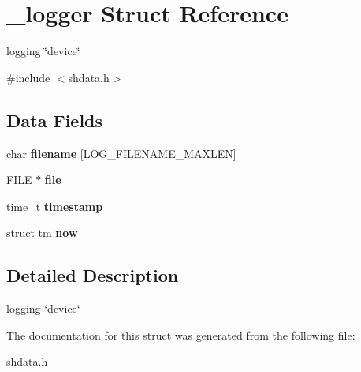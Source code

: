 \hypertarget{struct__logger}{\section{\-\_\-logger Struct Reference}
\label{struct__logger}
}


logging \char`\"{}device\char`\"{}  




{\ttfamily \#include $<$shdata.\-h$>$}

\subsection*{Data Fields}
\begin{DoxyCompactItemize}
\item 
\hypertarget{struct__logger_aa9c4b330499a3e9f78db33fba42e2f52}{char {\bfseries filename} \mbox{[}L\-O\-G\-\_\-\-F\-I\-L\-E\-N\-A\-M\-E\-\_\-\-M\-A\-X\-L\-E\-N\mbox{]}}\label{struct__logger_aa9c4b330499a3e9f78db33fba42e2f52}

\item 
\hypertarget{struct__logger_a702945180aa732857b380a007a7e2a21}{F\-I\-L\-E $\ast$ {\bfseries file}}\label{struct__logger_a702945180aa732857b380a007a7e2a21}

\item 
\hypertarget{struct__logger_a2f48d949c7a1e7bf2ce81c70caa7c3ec}{time\-\_\-t {\bfseries timestamp}}\label{struct__logger_a2f48d949c7a1e7bf2ce81c70caa7c3ec}

\item 
\hypertarget{struct__logger_a314848c273e255b0a91cf779044cf8ac}{struct tm {\bfseries now}}\label{struct__logger_a314848c273e255b0a91cf779044cf8ac}

\end{DoxyCompactItemize}


\subsection{Detailed Description}
logging \char`\"{}device\char`\"{} 

The documentation for this struct was generated from the following file\-:\begin{DoxyCompactItemize}
\item 
shdata.\-h\end{DoxyCompactItemize}

